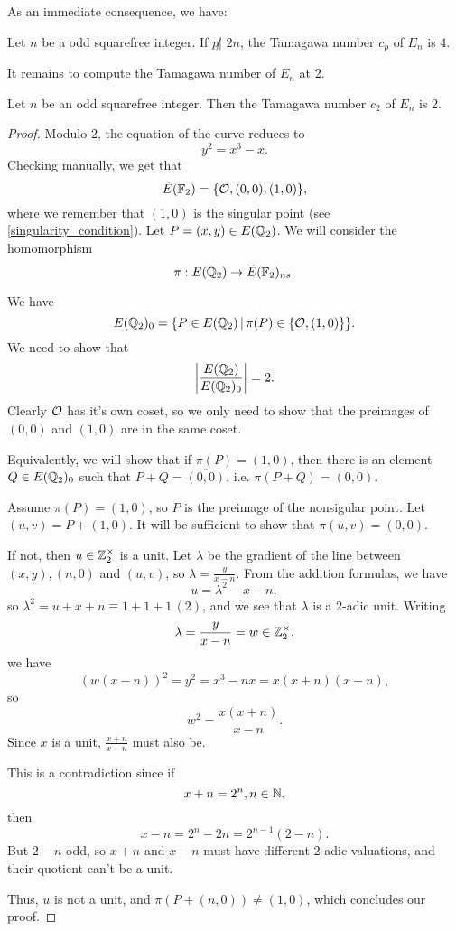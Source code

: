 \documentclass[12pt, a4paper]{amsart}
\begin{document}
As an immediate consequence, we have: 

\begin{thm}
  Let $n$ be a odd squarefree integer.
  If $p \not| \,\, 2n $, the Tamagawa number $c_p$ of $E_n$ is 4.
\end{thm}

It remains to compute the Tamagawa number of $E_n$ at 2.

\begin{thm}
  Let $n$ be an odd squarefree integer. Then the Tamagawa number $c_2$
  of $E_n$ is 2.
\end{thm}

\begin{proof}
  Modulo 2, the equation of the curve reduces to
  \[y^2 = x^3 - x.\]
  Checking manually, we get that 
  \[\tilde{E}(\mathbb{F}_2) = \{{\mathcal O}, (0,0), (1,0)\},\]
  where we remember that $(1,0)$ is the singular point
  (see \autoref{singularity_condition}).
  Let $P = (x,y) \in E({\mathbb Q}_2)$. We will consider the homomorphism
  \[\pi: E({\mathbb Q}_2) \rightarrow \tilde{E}(\mathbb{F}_2)_{ns}.\]

  We have
  \[E({\mathbb Q}_2)_0 = \{P \in E({\mathbb Q}_2) \, | \, \pi(P) \in \{ {\mathcal O}, (1,0)\}\}.\]
  We need to show that
  \[\left| \frac{E({\mathbb Q}_2)}{E({\mathbb Q}_2)_0} \right| = 2.\]
  Clearly ${\mathcal O}$ has it's own coset, so we only need to show that the preimages
  of $(0,0)$ and $(1,0)$ are in the same coset.
  
  Equivalently, we will show that if $\pi(P) = (1,0)$, then there is an
  element $Q \in E({\mathbb Q}_2)_0$ such that $\overline{P+Q} = \overline{(0,0)}$,
  i.e. $\pi(P+Q) = (0,0)$.
  
  Assume $\pi(P) = (1,0)$, so $P$ is the preimage of the nonsigular point.
  Let $(u,v) = P + (1,0)$. It will be sufficient to show that $\pi(u,v) = (0,0)$.

  If not, then $u \in {\mathbb Z}_2^{\times}$ is a unit. Let $\lambda$ be the gradient of the
  line between $(x,y), (n,0)$ and $(u,v)$, so $\lambda = \frac{y}{x-n}$.
  From the addition formulas, we have
  \[u = \lambda^2 - x - n,\]
  so $\lambda^2 = u + x + n \equiv 1 + 1 + 1\, (2)$, and we see that $\lambda$
  is a 2-adic unit. Writing
  \[\lambda = \frac{y}{x-n} = w \in {\mathbb Z}_2^{\times},\]
  we have
  \[(w(x-n))^2 = y^2 = x^3 -nx = x(x+n)(x-n),\]
  so
  \[w^2 = \frac{x(x+n)}{x-n}.\]
  Since $x$ is a unit, $\frac{x+n}{x-n}$ must also be.

  This is a contradiction since if
  $$x+n = 2^n, n \in {\mathbb N},$$ then $$x-n = 2^n - 2n
  = 2^{n-1}(2-n).$$
  But $2-n$ odd, so $x+n$ and $x-n$ must have different 2-adic
  valuations, and their quotient can't be a unit.

  Thus, $u$ is not a unit, and $\pi(P+(n,0)) \neq (1,0)$, which concludes our proof.
\end{proof}


\printbibliography
\end{document}
